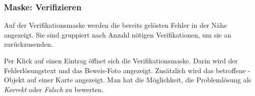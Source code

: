 \begin{figure}[H]
\hfill
{}
\end{figure}

\cleardoublepage
\subsubsection{Maske: Verifizieren}
Auf der Verifikationsmaske werden die bereits gelösten Fehler in der Nähe angezeigt.
Sie sind gruppiert nach Anzahl nötigen Verifikationen, um sie an  zurückzusenden.

Per Klick auf einen Eintrag öffnet sich die Verifikationsmaske.
Darin wird der Fehlerlösungstext und das Beweis-Foto angezeigt.
Zusätzlich wird das betroffene -Objekt auf einer Karte angezeigt.
Man hat die Möglichkeit, die Problemlösung als \emph{Korrekt} oder \emph{Falsch} zu bewerten.

